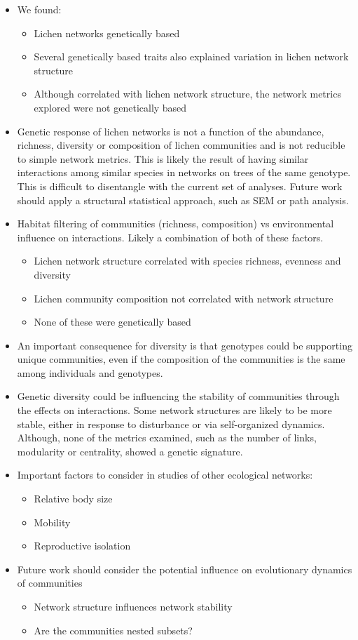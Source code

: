 \documentclass[11pt,twocolumn,twoside,lineno]{pnas-new}
\begin{document}
\begin{itemize}
\item We found:
  \begin{itemize}
  \item Lichen networks genetically based
  \item Several genetically based traits also explained variation in
    lichen network structure
  \item Although correlated with lichen network structure, the network
    metrics explored were not genetically based
  \end{itemize}
\item Genetic response of lichen networks is not a function of the
  abundance, richness, diversity or composition of lichen communities
  and is not reducible to simple network metrics. This is likely the
  result of having similar interactions among similar species in
  networks on trees of the same genotype.  This is difficult to
  disentangle with the current set of analyses. Future work should
  apply a structural statistical approach, such as SEM or path
  analysis.
\item Habitat filtering of communities (richness, composition) vs
  environmental influence on interactions. Likely a combination of
  both of these factors.
  \begin{itemize}
  \item Lichen network structure correlated with species richness,
    evenness and diversity
  \item Lichen community composition not correlated with network
    structure
  \item None of these were genetically based
  \end{itemize}
\item An important consequence for diversity is that genotypes could
  be supporting unique communities, even if the composition of the
  communities is the same among individuals and genotypes.
\item Genetic diversity could be influencing the stability of
  communities through the effects on interactions. Some network
  structures are likely to be more stable, either in response to
  disturbance or via self-organized dynamics. Although, none of the
  metrics examined, such as the number of links, modularity or
  centrality, showed a genetic signature.
\item Important factors to consider in studies of other ecological
  networks:
  \begin{itemize}
  \item Relative body size 
  \item Mobility
  \item Reproductive isolation
  \end{itemize}
\item Future work should consider the potential influence on
  evolutionary dynamics of communities
  \begin{itemize}
  \item Network structure influences network stability
  \item Are the communities nested subsets?
  \end{itemize}
\end{itemize}
\end{document}
